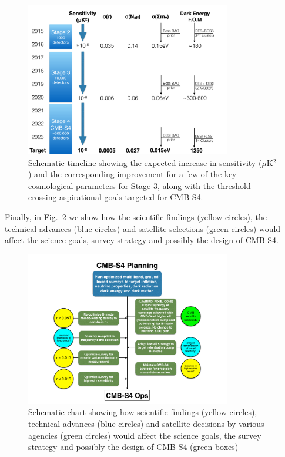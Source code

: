 
\begin{figure}[t]
\centering \includegraphics[width=0.8\textwidth]{Intro/Fig-FlowChart1_v1.pdf}
\vskip 10pt \caption{Schematic timeline showing the expected increase in sensitivity ($\mu$K$^2$) and the corresponding improvement for a few of the key cosmological parameters for Stage-3, along with the threshold-crossing aspirational goals targeted for CMB-S4.}
\label{fig:science_timeline-intro}
\end{figure}

Finally, in Fig.~\ref{fig:flowchart} we show how the scientific findings (yellow circles), the technical advances (blue circles) and satellite selections (green circles) would affect the science goals, survey strategy and possibly the design of CMB-S4.

\begin{figure}[ht]
\centering \includegraphics[trim=1in 0in 1.2in 0in, clip, width=0.8\textwidth,]{Intro/Fig-FlowChart2_v1.pdf}
\caption{Schematic chart showing how scientific findings (yellow circles), technical advances (blue circles) and satellite decisions by various agencies (green circles) would affect the science goals, the survey strategy and possibly the design of CMB-S4 (green boxes)}
\label{fig:flowchart}
\end{figure}



%




